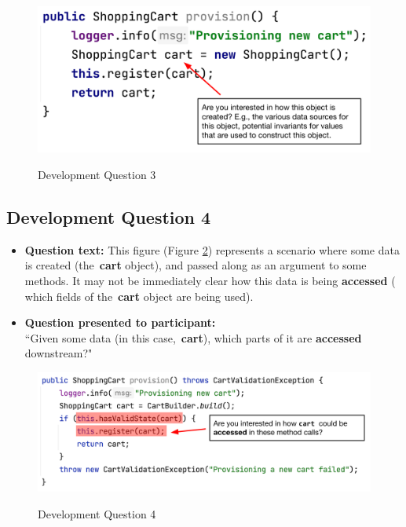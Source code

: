 \begin{figure}[ht]
\centering
\caption{Development Question 3}
\includegraphics[width=\textwidth]{./figs/ds3.png}
\label{fig:DS3}
\end{figure}

\subsection{Development Question 4}

\begin{itemize}
  \item[] \textbf{Question text:} This figure (Figure \ref{fig:DS4}) represents 
          a scenario where some data is created (the \textbf{cart} object), and
          passed along as an argument to some methods. It may not be 
          immediately clear how this data is being \textbf{accessed} (\eg 
          which fields of the \textbf{cart} object are being used).
  \item[] \textbf{Question presented to participant:}  \\
          ``Given some data (in this case, \textbf{cart}), which parts of it
          are \textbf{accessed} downstream?"
\end{itemize}

\begin{figure}[ht]
\centering
\caption{Development Question 4}
\includegraphics[width=\textwidth]{./figs/ds4.png}
\label{fig:DS4}
\end{figure}

